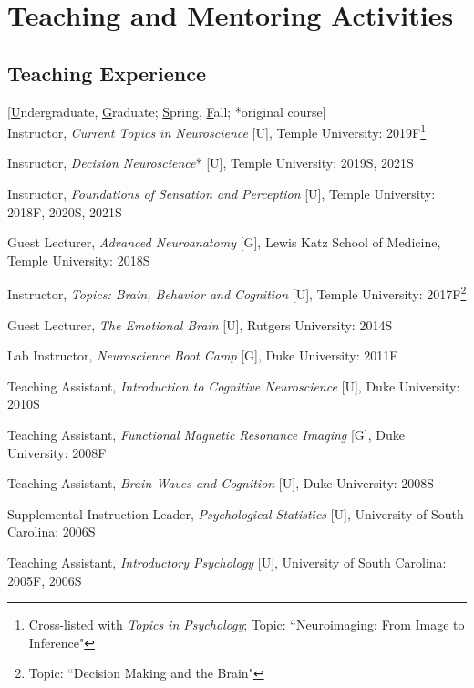 \documentclass[11pt, letterpaper]{article}
\begin{document}
\vspace{.2cm}
\section*{Teaching and Mentoring Activities}
\subsection*{Teaching Experience}

[\underline{U}ndergraduate, \underline{G}raduate; \underline{S}pring, \underline{F}all; *original course] \\ [.2cm]
Instructor, \textit{Current Topics in Neuroscience} [U], Temple University: 2019F\footnote{Cross-listed with \textit{Topics in Psychology}; Topic: ``Neuroimaging: From Image to Inference"}

Instructor, \textit{Decision Neuroscience}* [U], Temple University: 2019S, 2021S

Instructor, \textit{Foundations of Sensation and Perception} [U], Temple University: 2018F, 2020S, 2021S

Guest Lecturer, \textit{Advanced Neuroanatomy} [G], Lewis Katz School of Medicine, Temple University: 2018S

Instructor, \textit{Topics: Brain, Behavior and Cognition} [U], Temple University: 2017F\footnote{Topic: ``Decision Making and the Brain"}

Guest Lecturer, \textit{The Emotional Brain} [U], Rutgers University: 2014S

Lab Instructor, \textit{Neuroscience Boot Camp} [G], Duke University: 2011F

Teaching Assistant, \textit{Introduction to Cognitive Neuroscience} [U], Duke University: 2010S

Teaching Assistant, \textit{Functional Magnetic Resonance Imaging} [G], Duke University: 2008F

Teaching Assistant, \textit{Brain Waves and Cognition} [U], Duke University: 2008S

Supplemental Instruction Leader, \textit{Psychological Statistics} [U], University of South Carolina: 2006S

Teaching Assistant, \textit{Introductory Psychology} [U], University of South Carolina: 2005F, 2006S \\
\end{document}
